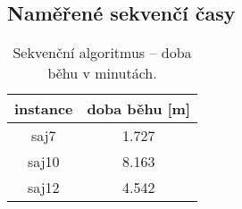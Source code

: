 \documentclass{article}
\begin{document}
    \subsection{Naměřené sekvenčí časy}

    \begin{table}[hb!]
        \centering
        \begin{tabular}{|c|c|}
            \hline
            \multicolumn{1}{|l|}{\textbf{instance}} & \multicolumn{1}{l|}{\textbf{{}doba běhu} {[}m{]}} \\ \hline
            saj7                           & 1.727                                       \\ \hline
            saj10                          & 8.163                                       \\ \hline
            saj12                          & 4.542                                       \\ \hline
        \end{tabular}
        \caption{Sekvenční algoritmus -- doba běhu v minutách.}
        \label{tab:seq}
    \end{table}
\end{document}
